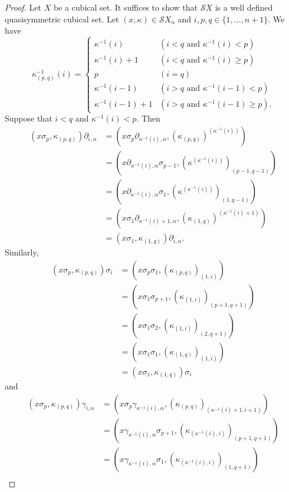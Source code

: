 \documentclass[oneside, 12pt]{amsart}
\numberwithin{equation}{section}
\theoremstyle{plain}
\theoremstyle{definition}
\theoremstyle{remark}
\begin{document}
	\begin{proof}
		Let $X$ be a cubical set. It suffices to show that $\mathcal{S}X$ is a well defined quasisymmetric cubical set. Let $(x,\kappa)\in\mathcal{S}X_n$ and $i,p,q\in\{1,\ldots,n+1\}$. We have
		\[
		\kappa_{(p,q)}^{-1}(i)=
		\begin{cases}
			\kappa^{-1}(i)&(i<q\text{ and }\kappa^{-1}(i)<p)\\
			\kappa^{-1}(i)+1&(i<q\text{ and }\kappa^{-1}(i)\ge p)\\
			p&(i=q)\\
			\kappa^{-1}(i-1)&(i>q\text{ and }\kappa^{-1}(i-1)<p)\\
			\kappa^{-1}(i-1)+1&(i>q\text{ and }\kappa^{-1}(i-1)\ge p).
		\end{cases}
		\]
		Suppose that $i<q$ and $\kappa^{-1}(i)<p$. Then
		\begin{align*}
			(x\sigma_p,\kappa_{(p,q)})\partial_{i,\alpha}&=(x\sigma_p\partial_{\kappa^{-1}(i),\alpha},(\kappa_{(p,q)})^{(\kappa^{-1}(i))})\\
			&=(x\partial_{\kappa^{-1}(i),\alpha}\sigma_{p-1},(\kappa^{(\kappa^{-1}(i))})_{(p-1,q-1)})\\
			&=(x\partial_{\kappa^{-1}(i),\alpha}\sigma_{1},(\kappa^{(\kappa^{-1}(i))})_{(1,q-1)})\\
			&=(x\sigma_{1}\partial_{\kappa^{-1}(i)+1,\alpha},(\kappa_{(1,q)})^{(\kappa^{-1}(i)+1)})\\
			&=(x\sigma_1,\kappa_{(1,q)})\partial_{i,\alpha}.
		\end{align*}
		Similarly,
		\begin{align*}
			(x\sigma_p,\kappa_{(p,q)})\sigma_i&=(x\sigma_p\sigma_1,(\kappa_{(p,q)})_{(1,i)})\\
			&=(x\sigma_1\sigma_{p+1},(\kappa_{(1,i)})_{(p+1,q+1)})\\
			&=(x\sigma_1\sigma_{2},(\kappa_{(1,i)})_{(2,q+1)})\\
			&=(x\sigma_1\sigma_1,(\kappa_{(1,q)})_{(1,i)})\\
			&=(x\sigma_1,\kappa_{(1,q)})\sigma_i
		\end{align*}
		and
		\begin{align*}
			(x\sigma_p,\kappa_{(p,q)})\gamma_{i,\alpha}&=(x\sigma_p\gamma_{\kappa^{-1}(i),\alpha},(\kappa_{(p,q)})_{(\kappa^{-1}(i)+1,i+1)})\\
			&=(x\gamma_{\kappa^{-1}(i),\alpha}\sigma_{p+1},(\kappa_{(\kappa^{-1}(i),i)})_{(p+1,q+1)})\\
			&=(x\gamma_{\kappa^{-1}(i),\alpha}\sigma_1,(\kappa_{(\kappa^{-1}(i),i)})_{(1,q+1)})\\

\end{align*}
\end{proof}
\end{document}
